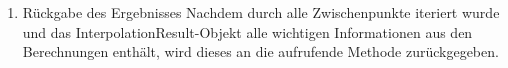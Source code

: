 \begin{itemize}
\begin{enumerate}
\item Rückgabe des Ergebnisses
Nachdem durch alle Zwischenpunkte iteriert wurde und das InterpolationResult-Objekt alle wichtigen Informationen aus den Berechnungen enthält, wird dieses an die aufrufende Methode zurückgegeben.
\end{enumerate}
\end{itemize}